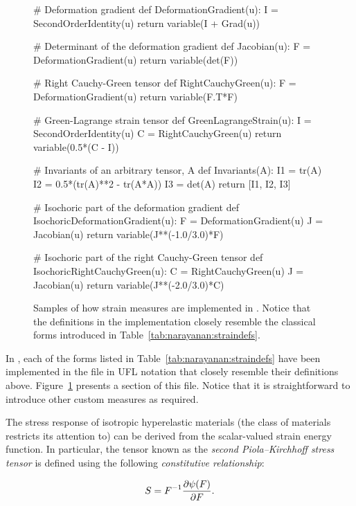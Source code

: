 \begin{figure}[ht]
\begin{python}
# Deformation gradient
def DeformationGradient(u):
    I = SecondOrderIdentity(u)
    return variable(I + Grad(u))

# Determinant of the deformation gradient
def Jacobian(u):
    F = DeformationGradient(u)
    return variable(det(F))

# Right Cauchy-Green tensor
def RightCauchyGreen(u):
    F = DeformationGradient(u)
    return variable(F.T*F)

# Green-Lagrange strain tensor
def GreenLagrangeStrain(u):
    I = SecondOrderIdentity(u)
    C = RightCauchyGreen(u)
    return variable(0.5*(C - I))

# Invariants of an arbitrary tensor, A
def Invariants(A):
    I1 = tr(A)
    I2 = 0.5*(tr(A)**2 - tr(A*A))
    I3 = det(A)
    return [I1, I2, I3]

# Isochoric part of the deformation gradient
def IsochoricDeformationGradient(u):
    F = DeformationGradient(u)
    J = Jacobian(u)
    return variable(J**(-1.0/3.0)*F)

# Isochoric part of the right Cauchy-Green tensor
def IsochoricRightCauchyGreen(u):
    C = RightCauchyGreen(u)
    J = Jacobian(u)
    return variable(J**(-2.0/3.0)*C)
\end{python}
\caption{Samples of how strain measures are implemented in
  \twist. Notice that the definitions in the implementation closely
  resemble the classical forms introduced in
  Table~\ref{tab:narayanan:straindefs}.}
\label{code:narayanan:kinematics.py}
\end{figure}

In \twist, each of the forms listed in
Table~\ref{tab:narayanan:straindefs} have been implemented in the file
 in UFL notation that closely resemble their
definitions above. Figure~\ref{code:narayanan:kinematics.py} presents
a section of this file. Notice that it is straightforward to introduce
other custom measures as required.

The stress response of isotropic hyperelastic materials (the class of
materials \twist{} restricts its attention to) can be derived from the
scalar-valued strain energy function. In particular, the tensor known
as the {\em second Piola--Kirchhoff stress tensor} is defined using the
following {\em constitutive relationship}:

\begin{equation}
\mbox{$ S$} = \mbox{$ F$}^{-1} \frac{\partial \psi(\mbox{$ F$})}{\partial \mbox{$ F$}}.
\end{equation}

